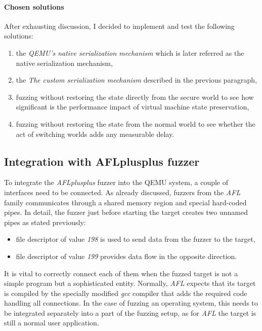 \paragraph{Chosen solutions}
After exhausting discussion, I decided to implement and test the following solutions:
\begin{enumerate}
    \item the \textit{QEMU's native serialization mechanism} which is later referred as the native serialization mechanism,
    \item the \textit{The custom serialization mechanism} described in the previous paragraph,
    \item fuzzing without restoring the state directly from the secure world to see how significant is the performance impact of virtual machine state preservation,
    \item fuzzing without restoring the state from the normal world to see whether the act of switching worlds adds any measurable delay.
\end{enumerate}

\clearpage
\subsection{Integration with AFLplusplus fuzzer} \label{sec:translator}
To integrate the \textit{AFLplusplus} fuzzer into the QEMU system, a couple of interfaces need to be connected. As already discussed, fuzzers from the \textit{AFL} family communicates through a shared memory region and special hard-coded pipes. In detail, the fuzzer just before starting the target creates two unnamed pipes as stated previously:
\begin{itemize}
    \item file descriptor of value \textit{198} is used to send data from the fuzzer to the target,
    \item file descriptor of value \textit{199} provides data flow in the opposite direction.
\end{itemize}
It is vital to correctly connect each of them when the fuzzed target is not a simple program but a sophisticated entity. Normally, \textit{AFL} expects that its target is compiled by the specially modified \textit{gcc} compiler that adds the required code handling all connections. In the case of fuzzing an operating system, this needs to be integrated separately into a part of the fuzzing setup, as for \textit{AFL} the target is still a normal user application. 

